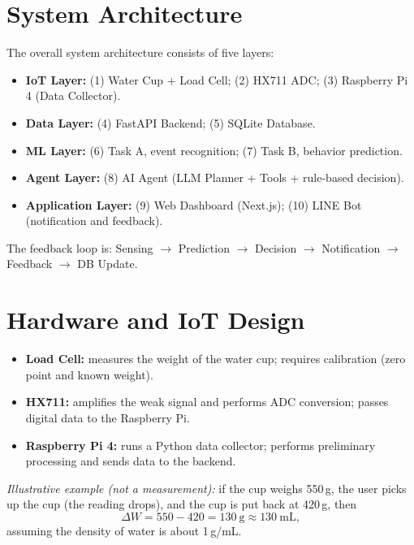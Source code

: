 \documentclass[conference]{IEEEtran}
\begin{document}
\section{System Architecture}\label{sec:architecture}

The overall system architecture consists of five layers:
\begin{itemize}
\item \textbf{IoT Layer:} (1) Water Cup + Load Cell; (2) HX711 ADC; (3) Raspberry Pi 4 (Data Collector).
\item \textbf{Data Layer:} (4) FastAPI Backend; (5) SQLite Database.
\item \textbf{ML Layer:} (6) Task A, event recognition; (7) Task B, behavior prediction.
\item \textbf{Agent Layer:} (8) AI Agent (LLM Planner + Tools + rule-based decision).
\item \textbf{Application Layer:} (9) Web Dashboard (Next.js); (10) LINE Bot (notification and feedback).
\end{itemize}
The feedback loop is: Sensing $\rightarrow$ Prediction $\rightarrow$ Decision $\rightarrow$ Notification $\rightarrow$ Feedback $\rightarrow$ DB Update.

\section{Hardware and IoT Design}\label{sec:hardware}

\begin{itemize}
\item \textbf{Load Cell:} measures the weight of the water cup; requires calibration (zero point and known weight).
\item \textbf{HX711:} amplifies the weak signal and performs ADC conversion; passes digital data to the Raspberry Pi.
\item \textbf{Raspberry Pi 4:} runs a Python data collector; performs preliminary processing and sends data to the backend.
\end{itemize}

\textit{Illustrative example (not a measurement):} if the cup weighs 550\,g, the user picks up the cup (the reading drops), and the cup is put back at 420\,g, then
\begin{equation}
\Delta W = 550 - 420 = 130\ \text{g} \approx 130\ \text{mL},
\end{equation}
assuming the density of water is about 1\,g/mL.
\end{document}
